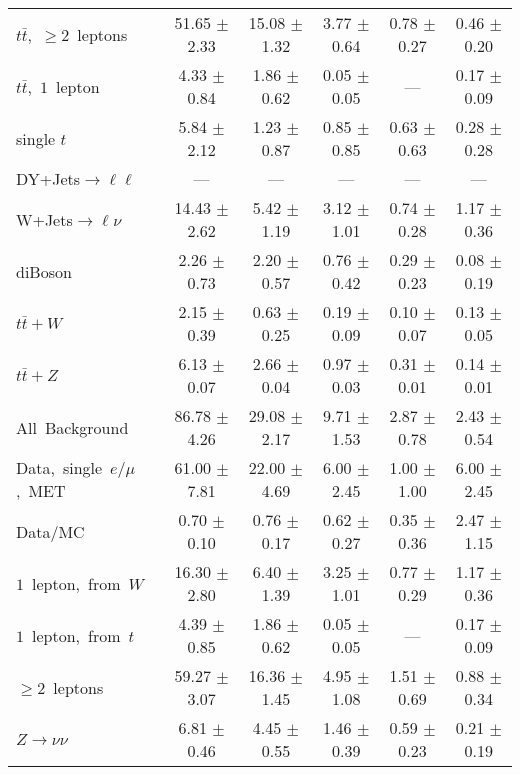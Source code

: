 \documentclass{article}
\begin{document}
\begin{longtable}{|l|c|c|c|c|c|}
$t\bar{t}$,~$\ge2$~leptons & 51.65 $\pm$ 2.33  & 15.08 $\pm$ 1.32  & 3.77 $\pm$ 0.64  & 0.78 $\pm$ 0.27  & 0.46 $\pm$ 0.20 \\* 
$t\bar{t}$,~$1$~lepton & 4.33 $\pm$ 0.84  & 1.86 $\pm$ 0.62  & 0.05 $\pm$ 0.05  & ---  & 0.17 $\pm$ 0.09 \\* 
single $t$  & 5.84 $\pm$ 2.12  & 1.23 $\pm$ 0.87  & 0.85 $\pm$ 0.85  & 0.63 $\pm$ 0.63  & 0.28 $\pm$ 0.28 \\* 
DY+Jets$\rightarrow\ell\ell$  & ---  & ---  & ---  & ---  & --- \\* 
W+Jets$\rightarrow\ell\nu$  & 14.43 $\pm$ 2.62  & 5.42 $\pm$ 1.19  & 3.12 $\pm$ 1.01  & 0.74 $\pm$ 0.28  & 1.17 $\pm$ 0.36 \\* 
diBoson  & 2.26 $\pm$ 0.73  & 2.20 $\pm$ 0.57  & 0.76 $\pm$ 0.42  & 0.29 $\pm$ 0.23  & 0.08 $\pm$ 0.19 \\* 
$t\bar{t}+W$  & 2.15 $\pm$ 0.39  & 0.63 $\pm$ 0.25  & 0.19 $\pm$ 0.09  & 0.10 $\pm$ 0.07  & 0.13 $\pm$ 0.05 \\* 
$t\bar{t}+Z$  & 6.13 $\pm$ 0.07  & 2.66 $\pm$ 0.04  & 0.97 $\pm$ 0.03  & 0.31 $\pm$ 0.01  & 0.14 $\pm$ 0.01 \\* 
\hline \hline 
All~Background  & 86.78 $\pm$ 4.26  & 29.08 $\pm$ 2.17  & 9.71 $\pm$ 1.53  & 2.87 $\pm$ 0.78  & 2.43 $\pm$ 0.54 \\* 
Data,~single~$e/\mu$,~MET  & 61.00 $\pm$ 7.81  & 22.00 $\pm$ 4.69  & 6.00 $\pm$ 2.45  & 1.00 $\pm$ 1.00  & 6.00 $\pm$ 2.45 \\* 
Data/MC  & 0.70 $\pm$ 0.10  & 0.76 $\pm$ 0.17  & 0.62 $\pm$ 0.27  & 0.35 $\pm$ 0.36  & 2.47 $\pm$ 1.15 \\* 
\hline \hline 
$1$~lepton,~from~$W$  & 16.30 $\pm$ 2.80  & 6.40 $\pm$ 1.39  & 3.25 $\pm$ 1.01  & 0.77 $\pm$ 0.29  & 1.17 $\pm$ 0.36 \\* 
$1$~lepton,~from~$t$  & 4.39 $\pm$ 0.85  & 1.86 $\pm$ 0.62  & 0.05 $\pm$ 0.05  & ---  & 0.17 $\pm$ 0.09 \\* 
$\ge2$~leptons  & 59.27 $\pm$ 3.07  & 16.36 $\pm$ 1.45  & 4.95 $\pm$ 1.08  & 1.51 $\pm$ 0.69  & 0.88 $\pm$ 0.34 \\* 
$Z\rightarrow\nu\nu$  & 6.81 $\pm$ 0.46  & 4.45 $\pm$ 0.55  & 1.46 $\pm$ 0.39  & 0.59 $\pm$ 0.23  & 0.21 $\pm$ 0.19 \\* 
\hline 
\end{longtable} 

 
 
 
 
\pagebreak 

 
 
\end{document}
